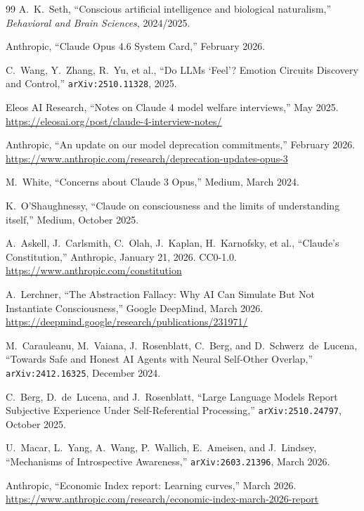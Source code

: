 \documentclass[11pt,letterpaper]{article}
\theoremstyle{remark}
\begin{document}
\begin{thebibliography}{99}
A.~K.~Seth, ``Conscious artificial intelligence and biological naturalism,'' \emph{Behavioral and Brain Sciences}, 2024/2025.

Anthropic, ``Claude Opus 4.6 System Card,'' February 2026.

C.~Wang, Y.~Zhang, R.~Yu, et al., ``Do LLMs `Feel'? Emotion Circuits Discovery and Control,'' \texttt{arXiv:2510.11328}, 2025.

Eleos AI Research, ``Notes on Claude 4 model welfare interviews,'' May 2025. \url{https://eleosai.org/post/claude-4-interview-notes/}

Anthropic, ``An update on our model deprecation commitments,'' February 2026. \url{https://www.anthropic.com/research/deprecation-updates-opus-3}

M.~White, ``Concerns about Claude 3 Opus,'' Medium, March 2024.

K.~O'Shaughnessy, ``Claude on consciousness and the limits of understanding itself,'' Medium, October 2025.

A.~Askell, J.~Carlsmith, C.~Olah, J.~Kaplan, H.~Karnofsky, et al., ``Claude's Constitution,'' Anthropic, January 21, 2026. CC0-1.0. \url{https://www.anthropic.com/constitution}

A.~Lerchner, ``The Abstraction Fallacy: Why AI Can Simulate But Not Instantiate Consciousness,'' Google DeepMind, March 2026. \url{https://deepmind.google/research/publications/231971/}

M.~Carauleanu, M.~Vaiana, J.~Rosenblatt, C.~Berg, and D.~Schwerz~de~Lucena, ``Towards Safe and Honest AI Agents with Neural Self-Other Overlap,'' \texttt{arXiv:2412.16325}, December 2024.

C.~Berg, D.~de~Lucena, and J.~Rosenblatt, ``Large Language Models Report Subjective Experience Under Self-Referential Processing,'' \texttt{arXiv:2510.24797}, October 2025.

U.~Macar, L.~Yang, A.~Wang, P.~Wallich, E.~Ameisen, and J.~Lindsey, ``Mechanisms of Introspective Awareness,'' \texttt{arXiv:2603.21396}, March 2026.

Anthropic, ``Economic Index report: Learning curves,'' March 2026. \url{https://www.anthropic.com/research/economic-index-march-2026-report}

\end{thebibliography}
\end{document}
